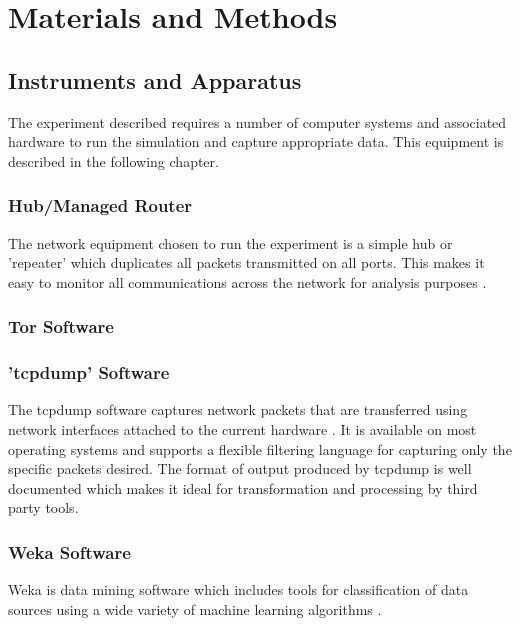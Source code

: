 
\chapter{Materials and Methods}

\section{Instruments and Apparatus}

The experiment described requires a number of computer systems and associated
hardware to run the simulation and capture appropriate data. This equipment is
described in the following chapter.

\subsection{Hub/Managed Router}

The network equipment chosen to run the experiment is a simple hub or
'repeater' which duplicates all packets transmitted on all ports. This makes it
easy to monitor all communications across the network for analysis purposes
\parencite{website:hub-reference}.

\subsection{Tor Software}


\subsection{'tcpdump' Software}

The tcpdump software captures network packets that are transferred using
network interfaces attached to the current hardware \parencite{:2009cr}.  It is
available on most operating systems and supports a flexible filtering language
for capturing only the specific packets desired. The format of output produced
by tcpdump is well documented \parencite{:nx} which makes it ideal for
transformation and processing by third party tools.

\subsection{Weka Software}

Weka is data mining software which includes tools for classification of data
sources using a wide variety of machine learning algorithms
\parencite{Hall:2009p7662}.

